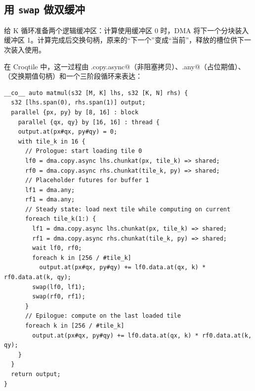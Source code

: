 \subsection*{用 \texttt{swap} 做双缓冲}

给 K 循环准备两个逻辑缓冲区：计算使用缓冲区 0 时，DMA 将下一个分块装入缓冲区 1。计算完成后交换句柄，原来的“下一个”变成“当前”，释放的槽位供下一次装入使用。

在 Croqtile 中，这一过程由 \co@dma.copy.async@（非阻塞拷贝）、\co@dma.any@（占位期值）、\co@swap@（交换期值句柄）和一个三阶段循环来表达：

\begin{lstlisting}[language=croqtile,caption={用 swap 做双缓冲}]
__co__ auto matmul(s32 [M, K] lhs, s32 [K, N] rhs) {
  s32 [lhs.span(0), rhs.span(1)] output;
  parallel {px, py} by [8, 16] : block
    parallel {qx, qy} by [16, 16] : thread {
    output.at(px#qx, py#qy) = 0;
    with tile_k in 16 {
      // Prologue: start loading tile 0
      lf0 = dma.copy.async lhs.chunkat(px, tile_k) => shared;
      rf0 = dma.copy.async rhs.chunkat(tile_k, py) => shared;
      // Placeholder futures for buffer 1
      lf1 = dma.any;
      rf1 = dma.any;
      // Steady state: load next tile while computing on current
      foreach tile_k(1:) {
        lf1 = dma.copy.async lhs.chunkat(px, tile_k) => shared;
        rf1 = dma.copy.async rhs.chunkat(tile_k, py) => shared;
        wait lf0, rf0;
        foreach k in [256 / #tile_k]
          output.at(px#qx, py#qy) += lf0.data.at(qx, k) * rf0.data.at(k, qy);
        swap(lf0, lf1);
        swap(rf0, rf1);
      }
      // Epilogue: compute on the last loaded tile
      foreach k in [256 / #tile_k]
        output.at(px#qx, py#qy) += lf0.data.at(qx, k) * rf0.data.at(k, qy);
    }
  }
  return output;
}
\end{lstlisting}
